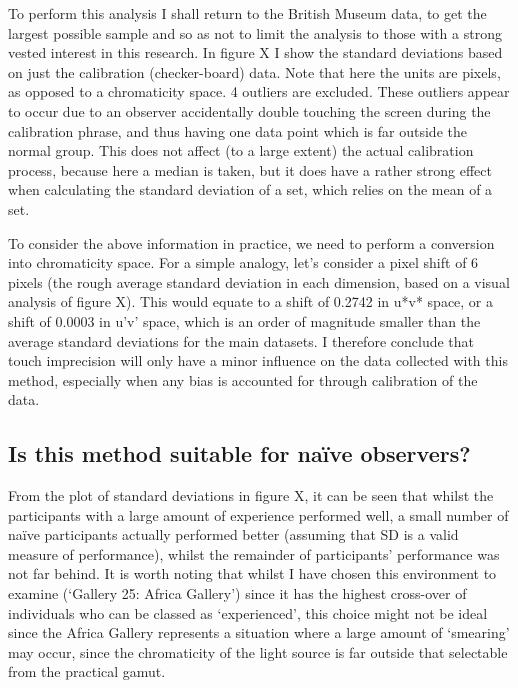 To perform this analysis I shall return to the British Museum data, to get the largest possible sample and so as not to limit the analysis to those with a strong vested interest in this research. In figure X I show the standard deviations based on just the calibration (checker-board) data. Note that here the units are pixels, as opposed to a chromaticity space. 4 outliers are excluded. These outliers appear to occur due to an observer accidentally double touching the screen during the calibration phrase, and thus having one data point which is far outside the normal group. This does not affect (to a large extent) the actual calibration process, because here a median is taken, but it does have a rather strong effect when calculating the standard deviation of a set, which relies on the mean of a set.


To consider the above information in practice, we need to perform a conversion into chromaticity space. For a simple analogy, let's consider a pixel shift of 6 pixels (the rough average standard deviation in each dimension, based on a visual analysis of figure X).
This would equate to a shift of 0.2742 in u*v* space, or a shift of 0.0003 in u'v' space, which is an order of magnitude smaller than the average standard deviations for the main datasets. I therefore conclude that touch imprecision will only have a minor influence on the data collected with this method, especially when any bias is accounted for through calibration of the data.

\subsection{Is this method suitable for naïve observers?}


From the plot of standard deviations in figure X, it can be seen that whilst the participants with a large amount of experience performed well, a small number of naïve participants actually performed better (assuming that SD is a valid measure of performance), whilst the remainder of participants' performance was not far behind. It is worth noting that whilst I have chosen this environment to examine (`Gallery 25: Africa Gallery') since it has the highest cross-over of individuals who can be classed as `experienced', this choice might not be ideal since the Africa Gallery represents a situation where a large amount of `smearing' may occur, since the chromaticity of the light source is far outside that selectable from the practical gamut.

